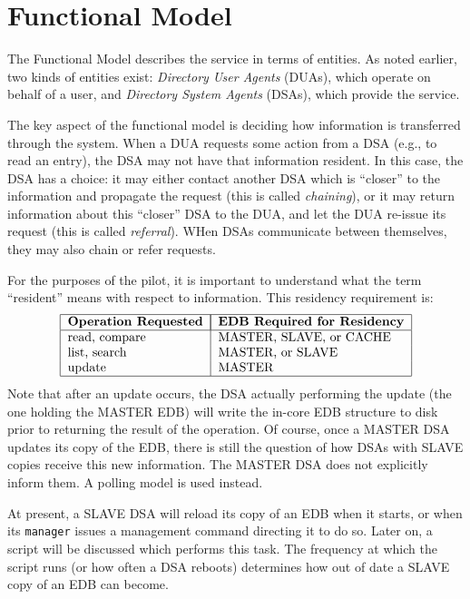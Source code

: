 \section	{Functional Model}
The Functional Model describes the service in terms of entities.
As noted earlier,
two kinds of entities exist:
{\em Directory User Agents\/} (DUAs),
which operate on behalf of a user,
and
{\em Directory System Agents\/} (DSAs),
which provide the service.

The key aspect of the functional model is deciding how information
is transferred through the system.
When a DUA requests some action from a DSA
(e.g., to read an entry),
the DSA may not have that information resident.
In this case,
the DSA has a choice:
it may either contact another DSA which is ``closer'' to the information
and propagate the request (this is called {\em chaining\/}),
or it may return information about this ``closer'' DSA to the DUA,
and let the DUA re-issue its request
(this is called {\em referral\/}).
WHen DSAs communicate between themselves,
they may also chain or refer requests.

For the purposes of the pilot,
it is important to understand what the term ``resident'' means with respect
to information.
This residency requirement is:
\[\begin{tabular}{|l|l|}
\hline
\multicolumn{1}{|c|}{\bf Operation Requested}&
		\multicolumn{1}{|c|}{\bf EDB Required for Residency}\\
\hline
read, compare&	MASTER, SLAVE, or CACHE\\
list, search&	MASTER, or SLAVE\\
update&		MASTER\\
\hline
\end{tabular}\]
Note that after an update occurs,
the DSA actually performing the update (the one holding the MASTER EDB)
will write the in-core EDB structure to disk prior to returning the result
of the operation.
Of course,
once a MASTER DSA updates its copy of the EDB,
there is still the question of how DSAs with SLAVE copies receive this
new information.
The MASTER DSA does not explicitly inform them.
A polling model is used instead.


At present,
a SLAVE DSA will reload its copy of an EDB when it starts,
or when its \verb"manager" issues a management command directing it to do so.
Later on,
a script will be discussed which performs this task.
The frequency at which the script runs (or how often a DSA reboots)
determines how out of date a SLAVE copy of an EDB can become.

